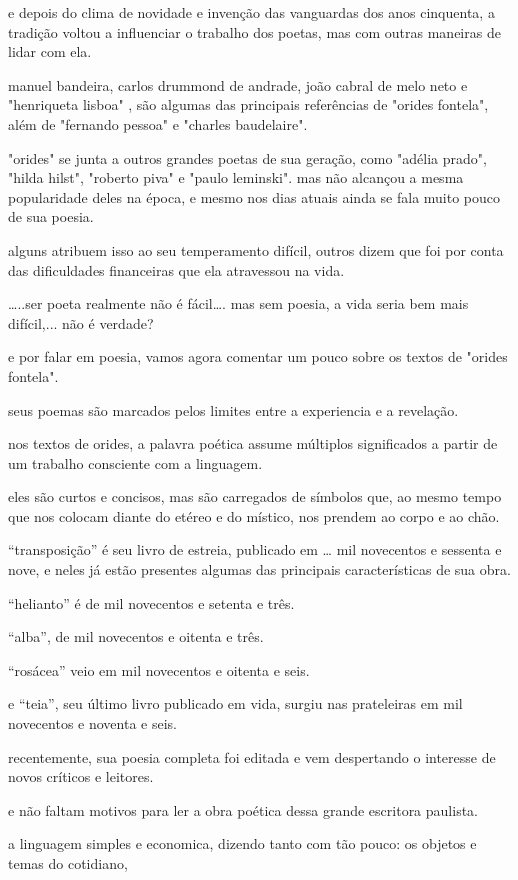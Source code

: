 e depois do clima de novidade e invenção das vanguardas dos anos cinquenta, a tradição voltou a influenciar o trabalho dos poetas, mas com outras maneiras de lidar com ela.

manuel bandeira, carlos drummond de andrade, joão cabral de melo neto  e "henriqueta lisboa" ,    são algumas das principais referências de "orides fontela", além de "fernando pessoa" e "charles baudelaire".


"orides" se junta a outros grandes poetas de sua geração, como "adélia prado", "hilda hilst", "roberto piva" e "paulo leminski".
mas não alcançou a mesma popularidade deles na época, e mesmo nos dias atuais ainda se fala muito  pouco de sua poesia.

alguns atribuem isso ao seu temperamento difícil, outros dizem que foi por conta  das dificuldades financeiras que ela atravessou na vida.


…..ser poeta realmente não é fácil….
mas sem poesia, a vida seria bem mais difícil,... não é verdade?

e por falar em poesia, vamos agora comentar um pouco sobre os textos de "orides fontela".

seus poemas são marcados pelos limites entre a experiencia e a revelação.


nos textos de orides, a palavra poética assume múltiplos significados a partir de um trabalho consciente com a linguagem.


eles são curtos e concisos, mas são carregados de símbolos que, ao mesmo tempo que nos colocam diante do etéreo e do místico, nos prendem ao corpo e ao chão.


“transposição” é seu livro de estreia, publicado em …
mil novecentos e sessenta e nove,    e 
neles já estão presentes algumas das principais características de sua obra.


“helianto” é de mil novecentos e setenta e três.


“alba”, de mil novecentos e oitenta e três.


“rosácea” veio em mil novecentos e oitenta e seis.


e “teia”, seu último livro publicado em vida, surgiu nas prateleiras em  mil novecentos e noventa e seis.


recentemente, sua poesia completa foi editada e vem despertando o interesse de novos críticos e leitores.


e não faltam motivos para ler a obra poética dessa grande escritora paulista.


a linguagem simples e economica, dizendo  tanto com tão pouco:
os objetos e temas do cotidiano,


